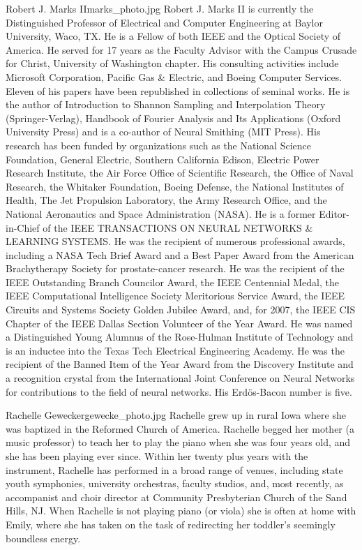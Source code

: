 \begin{authorbio}{Robert J. Marks II}{marks_photo.jpg}
Robert J. Marks II is currently the Distinguished Professor of Electrical and Computer Engineering 
at Baylor University, Waco, TX. He is a Fellow of both IEEE and the Optical Society
of America. He served for 17 years as the Faculty Advisor with the Campus Crusade for Christ,
University of Washington chapter. His consulting activities include Microsoft Corporation, Pacific
Gas \& Electric, and Boeing Computer Services. Eleven of his papers have been republished in collections 
of seminal works. He is the author of Introduction to Shannon Sampling and Interpolation
Theory (Springer-Verlag), Handbook of Fourier Analysis and Its Applications (Oxford University
Press) and is a co-author of Neural Smithing (MIT Press). His research has been funded by organizations 
such as the National Science Foundation, General Electric, Southern California Edison,
Electric Power Research Institute, the Air Force Office of Scientific Research, the Office of Naval
Research, the Whitaker Foundation, Boeing Defense, the National Institutes of Health, The Jet
Propulsion Laboratory, the Army Research Office, and the National Aeronautics and Space Administration 
(NASA). He is a former Editor-in-Chief of the IEEE TRANSACTIONS ON NEURAL
NETWORKS \& LEARNING SYSTEMS. He was the recipient of numerous professional awards,
including a NASA Tech Brief Award and a Best Paper Award from the American Brachytherapy
Society for prostate-cancer research. He was the recipient of the IEEE Outstanding Branch Councilor 
Award, the IEEE Centennial Medal, the IEEE Computational Intelligence Society Meritorious
Service Award, the IEEE Circuits and Systems Society Golden Jubilee Award, and, for 2007, the
IEEE CIS Chapter of the IEEE Dallas Section Volunteer of the Year Award. He was named a
Distinguished Young Alumnus of the Rose-Hulman Institute of Technology and is an inductee into
the Texas Tech Electrical Engineering Academy. He was the recipient of the Banned Item of the
Year Award from the Discovery Institute and a recognition crystal from the International Joint
Conference on Neural Networks for contributions to the field of neural networks. His Erd\"{o}s-Bacon
number is five.
\end{authorbio}

\begin{authorbio}{Rachelle Gewecke}{rgewecke_photo.jpg}
Rachelle grew up in rural Iowa where she was baptized in the Reformed Church of America.  Rachelle begged her mother (a music professor) to teach her to play the piano when she was four years old, and she has been playing ever since.  Within her twenty plus years with the instrument, Rachelle has performed in a broad range of venues, including state youth symphonies, university orchestras, faculty studios, and, most recently, as accompanist and choir director at Community Presbyterian Church of the Sand Hills, NJ.  When Rachelle is not playing piano (or viola) she is often at home with Emily, where she has taken on the task of redirecting her toddler’s seemingly boundless energy.
\end{authorbio}


